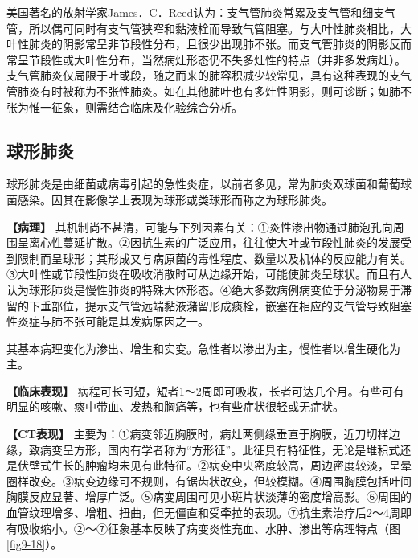 美国著名的放射学家James．C．Reed认为：支气管肺炎常累及支气管和细支气管，所以偶可同时有支气管狭窄和黏液栓而导致气管阻塞。与大叶性肺炎相比，大叶性肺炎的阴影常呈非节段性分布，且很少出现肺不张。而支气管肺炎的阴影反而常呈节段性或大叶性分布，当然病灶形态仍不失多灶性的特点（并非多发病灶）。支气管肺炎仅局限于叶或段，随之而来的肺容积减少较常见，具有这种表现的支气管肺炎有时被称为不张性肺炎。如在其他肺叶也有多灶性阴影，则可诊断；如肺不张为惟一征象，则需结合临床及化验综合分析。

\subsection{球形肺炎}

球形肺炎是由细菌或病毒引起的急性炎症，以前者多见，常为肺炎双球菌和葡萄球菌感染。因其在影像学上表现为球形或类球形而称之为球形肺炎。

\textbf{【病理】}
其机制尚不甚清，可能与下列因素有关：①炎性渗出物通过肺泡孔向周围呈离心性蔓延扩散。②因抗生素的广泛应用，往往使大叶或节段性肺炎的发展受到限制而呈球形；其形成又与病原菌的毒性程度、数量以及机体的反应能力有关。③大叶性或节段性肺炎在吸收消散时可从边缘开始，可能使肺炎呈球状。而且有人认为球形肺炎是慢性肺炎的特殊大体形态。④绝大多数病例病变位于分泌物易于滞留的下垂部位，提示支气管远端黏液潴留形成痰栓，嵌塞在相应的支气管导致阻塞性炎症与肺不张可能是其发病原因之一。

其基本病理变化为渗出、增生和实变。急性者以渗出为主，慢性者以增生硬化为主。

\textbf{【临床表现】}
病程可长可短，短者1～2周即可吸收，长者可达几个月。有些可有明显的咳嗽、痰中带血、发热和胸痛等，也有些症状很轻或无症状。

\textbf{【CT表现】}
主要为：①病变邻近胸膜时，病灶两侧缘垂直于胸膜，近刀切样边缘，致病变呈方形，国内有学者称为“方形征”。此征具有特征性，无论是堆积式还是伏壁式生长的肿瘤均未见有此特征。②病变中央密度较高，周边密度较淡，呈晕圈样改变。③病变边缘可不规则，有锯齿状改变，但较模糊。④周围胸膜包括叶间胸膜反应显著、增厚广泛。⑤病变周围可见小斑片状淡薄的密度增高影。⑥周围的血管纹理增多、增粗、扭曲，但无僵直和受牵拉的表现。⑦抗生素治疗后2～4周即有吸收缩小。②～⑦征象基本反映了病变炎性充血、水肿、渗出等病理特点（图\ref{fig9-18}）。

